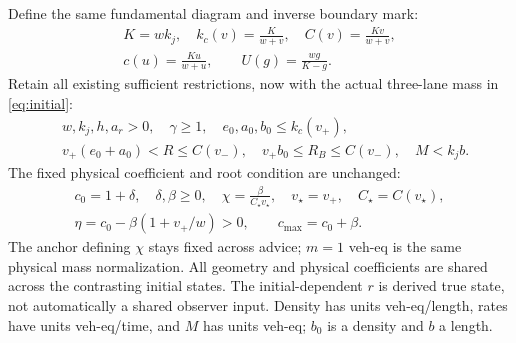 \documentclass[11pt,a4paper]{article}
\newcommand{\kc}{k_c}
\begin{document}
Define the same fundamental diagram and inverse boundary mark:
\begin{equation}
 \begin{gathered}
 K=wk_j,\quad \kc(v)=\frac{K}{w+v},\quad C(v)=\frac{Kv}{w+v},\\
 c(u)=\frac{Ku}{w+u},\qquad U(g)=\frac{wg}{K-g}.
 \end{gathered}
 \label{eq:fd}
\end{equation}
Retain all existing sufficient restrictions, now with the actual three-lane
mass in \eqref{eq:initial}:
\begin{align}
 &w,k_j,h,a_r>0,\quad\gamma\geq1,\quad
 e_0,a_0,b_0\leq\kc(v_+),\nonumber\\
 &v_+(e_0+a_0)<R\leq C(v_-),\quad
 v_+b_0\leq R_B\leq C(v_-),\quad M<k_jb.
 \label{eq:domain}
\end{align}
The fixed physical coefficient and root condition are unchanged:
\begin{equation}
 \begin{gathered}
 c_0=1+\delta,\quad \delta,\beta\geq0,\quad
 \chi=\frac{\beta}{C_\star v_\star},\quad
 v_\star=v_+,\quad C_\star=C(v_\star),\\
 \eta=c_0-\beta(1+v_+/w)>0,\qquad c_{\max}=c_0+\beta.
 \end{gathered} \label{eq:workdomain}
\end{equation}
The anchor defining $\chi$ stays fixed across advice; $m=1$ veh-eq is the
same physical mass normalization. All geometry and physical coefficients
are shared across the contrasting initial states. The initial-dependent
$r$ is derived true state, not automatically a shared observer input.
Density has units veh-eq/length, rates have units veh-eq/time, and $M$ has
units veh-eq; $b_0$ is a density and $b$ a length.
\end{document}
